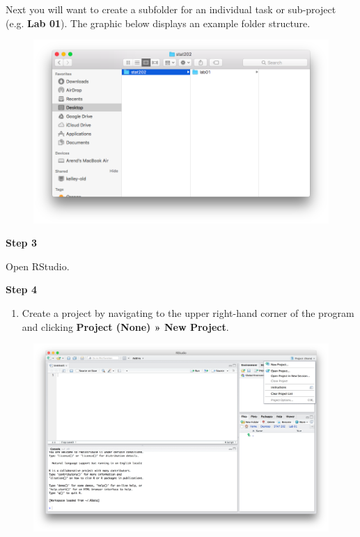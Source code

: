\documentclass[]{book}
\providecommand{\tightlist}{%
  \setlength{\itemsep}{0pt}\setlength{\parskip}{0pt}}
\theoremstyle{definition}
\theoremstyle{definition}
\theoremstyle{definition}
\theoremstyle{remark}
\begin{document}
Next you will want to create a subfolder for an individual task or
sub-project (e.g. \textbf{Lab 01}). The graphic below displays an
example folder structure.

\begin{figure}[htbp]
\centering
\includegraphics{./assets/images/01-01.png}
\caption{}
\end{figure}

\textbf{Step 3}

Open RStudio.

\textbf{Step 4}

\begin{enumerate}
\def\labelenumi{\arabic{enumi}.}
\setcounter{enumi}{3}
\tightlist
\item
  Create a project by navigating to the upper right-hand corner of the
  program and clicking \textbf{Project (None) » New Project}.
\end{enumerate}

\begin{figure}[htbp]
\centering
\includegraphics{./assets/images/01-02.png}
\caption{}
\end{figure}
\end{document}
